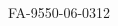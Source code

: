                \begin{center}
                 \begin{indentation}{0pt}{0pt}{0pt}
                 \end{indentation}
               \end{center} 

               \begin{center}
                 \begin{indentation}{0pt}{0pt}{0pt}
                 \end{indentation}
               \end{center} 

               \begin{center}
                 \begin{indentation}{0pt}{0pt}{0pt}
                 FA-9550-06-0312
                 \end{indentation}
               \end{center} 
